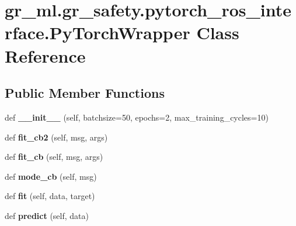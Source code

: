 \hypertarget{classgr__ml_1_1gr__safety_1_1pytorch__ros__interface_1_1PyTorchWrapper}{}\section{gr\+\_\+ml.\+gr\+\_\+safety.\+pytorch\+\_\+ros\+\_\+interface.\+Py\+Torch\+Wrapper Class Reference}
\label{classgr__ml_1_1gr__safety_1_1pytorch__ros__interface_1_1PyTorchWrapper}
\subsection*{Public Member Functions}
\begin{DoxyCompactItemize}
\item 
\mbox{\label{classgr__ml_1_1gr__safety_1_1pytorch__ros__interface_1_1PyTorchWrapper_a8a92a2eefb35608e2446064f1d61318e}} 
def {\bfseries \+\_\+\+\_\+init\+\_\+\+\_\+} (self, batchsize=50, epochs=2, max\+\_\+training\+\_\+cycles=10)
\item 
\mbox{\label{classgr__ml_1_1gr__safety_1_1pytorch__ros__interface_1_1PyTorchWrapper_abae9fcc52761ae3de83d896c3062a03d}} 
def {\bfseries fit\+\_\+cb2} (self, msg, args)
\item 
\mbox{\label{classgr__ml_1_1gr__safety_1_1pytorch__ros__interface_1_1PyTorchWrapper_a9369e6528080c6c161f9596b790c5e7d}} 
def {\bfseries fit\+\_\+cb} (self, msg, args)
\item 
\mbox{\label{classgr__ml_1_1gr__safety_1_1pytorch__ros__interface_1_1PyTorchWrapper_a7994a43d709ca8cb8bae4775d9b1b051}} 
def {\bfseries mode\+\_\+cb} (self, msg)
\item 
\mbox{\label{classgr__ml_1_1gr__safety_1_1pytorch__ros__interface_1_1PyTorchWrapper_a879cf0966ab4eec5bfafc18e58969501}} 
def {\bfseries fit} (self, data, target)
\item 
\mbox{\label{classgr__ml_1_1gr__safety_1_1pytorch__ros__interface_1_1PyTorchWrapper_a36e27444a41ce10ce725cdbe64b318c6}} 
def {\bfseries predict} (self, data)
\end{DoxyCompactItemize}
